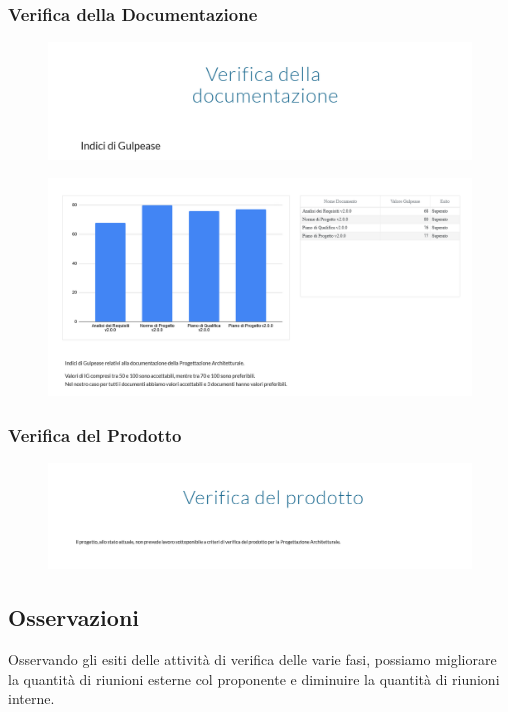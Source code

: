 \subsubsection{Verifica della Documentazione}
\begin{figure}[H]
	\includegraphics[scale=0.5]{res/images/cruscotto/pa_8.png}
\end{figure}
\begin{figure}[H]
	\includegraphics[scale=0.5]{res/images/cruscotto/pa_9.png}
\end{figure}
\subsubsection{Verifica del Prodotto}
\begin{figure}[H]
	\includegraphics[scale=0.5]{res/images/cruscotto/pa_10.png}
\end{figure}
\pagebreak
\subsection{Osservazioni}
Osservando gli esiti delle attività di verifica delle varie fasi, possiamo migliorare la quantità di riunioni esterne col proponente e diminuire la quantità di riunioni interne.